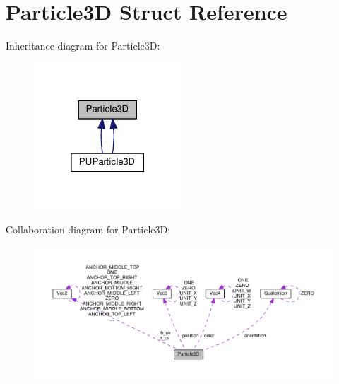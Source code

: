 \hypertarget{structParticle3D}{}\section{Particle3D Struct Reference}
\label{structParticle3D}


Inheritance diagram for Particle3D\+:
\nopagebreak
\begin{figure}[H]
\begin{center}
\leavevmode
\includegraphics[width=157pt]{structParticle3D__inherit__graph}
\end{center}
\end{figure}


Collaboration diagram for Particle3D\+:
\nopagebreak
\begin{figure}[H]
\begin{center}
\leavevmode
\includegraphics[width=350pt]{structParticle3D__coll__graph}
\end{center}
\end{figure}
